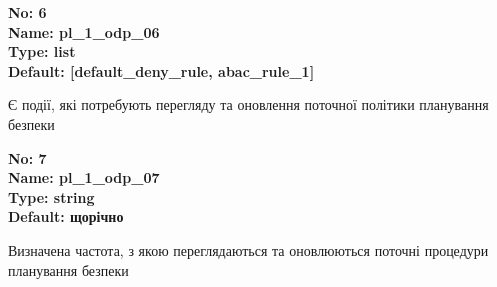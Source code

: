 \documentclass{article}
\begin{document}
{\footnotesize\bfseries
No: 6\\
Name: pl\_\allowbreak{}1\_\allowbreak{}odp\_\allowbreak{}06\\
Type: list\\
Default: [\textquotedbl{}default\_\allowbreak{}deny\_\allowbreak{}rule\textquotedbl{}, \textquotedbl{}abac\_\allowbreak{}rule\_\allowbreak{}1\textquotedbl{}]
}

{\footnotesize Є події, які потребують перегляду та оновлення поточної політики планування безпеки}


{\footnotesize\bfseries
No: 7\\
Name: pl\_\allowbreak{}1\_\allowbreak{}odp\_\allowbreak{}07\\
Type: string\\
Default: \textquotedbl{}щорічно\textquotedbl{}
}

{\footnotesize Визначена частота, з якою переглядаються та оновлюються поточні процедури планування безпеки}
\end{document}

